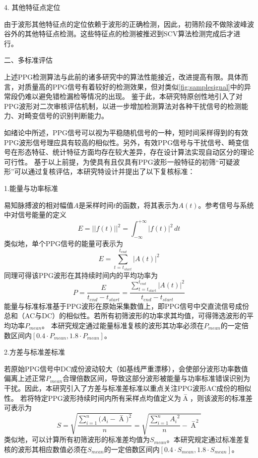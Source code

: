 4. 其他特征点定位

由于波形其他特征点的定位依赖于波形的正确检测，因此，初筛阶段不做除波峰波谷外的其他特征点检测。这些特征点的检测被推迟到SCV算法检测完成后才进行。

二、多标准评估

上述PPG检测算法与此前的诸多研究中的算法性能接近，改进提高有限。具体而言，对质量高的PPG信号有着较好的检测效果，但对类似\autoref{fig:samplesignal}中的异常段仍难以避免错检漏检等情况的出现。
鉴于此，本研究特原创性地引入了对PPG波形对二次审核评估机制，以进一步增加检测算法对各种干扰信号的检测能力、对畸变信号的识别判断能力。

如绪论中所述，PPG信号可以视为平稳随机信号的一种，短时间采样得到的有效PPG波形信号理应具有较高的相似性\cite{Qiu2012}。另外，有效PPG信号与干扰信号、畸变信号在形态特征、统计特征方面均存在较大差异，存在设计算法实现自动区分的理论可行性。
基于以上前提，为使具有且仅具有PPG波形一般特征的初筛“可疑波形”可以通过复核评估，本研究特设计并提出了以下复核标准：

1.能量与功率标准

易知脉搏波的相对幅值$A$是采样时间$t$的函数，将其表示为$A(t)$。参考信号与系统中对信号能量的定义\cite{Alan2019}
\begin{equation}
    \label{equ:energy}
    E=||f(t)||^2=\int_{-\infty}^{+\infty}{|f(t)|^2}\,d t
\end{equation}
类似地，单个PPG信号的能量可表示为
\begin{equation}
    \label{equ:ppge}
    E=\sum_{t=t_{start}}^{t_{end}}|A(t)|^2
\end{equation}
同理可得该PPG波形在其持续时间内的平均功率为
\begin{equation}
    \label{equ:ppgp}
    P=\frac{E}{t_{end}-t_{start}}=\frac{\sum_{t=t_{start}}^{t_{end}}|A(t)|^2}{t_{end}-t_{start}}
\end{equation}
能量与标准标准基于PPG波形在原始采集数值上，即PPG信号中交直流信号成份总和（AC与DC）的相似性。若所有初筛波形的功率求其均值，可得筛选波形的平均功率$P_{mean}$。
本研究规定通过能量标准复核的波形其功率必须在$P_{mean}$的一定倍数区间内$[0.4 \cdot P_{mean},1.8 \cdot P_{mean}]$。

2.方差与标准差标准

若原始PPG信号中DC成份波动较大（如基线严重漂移），会使部分波形功率数值偏离上述正常$P_{mean}$合理倍数区间，导致这部分波形被能量与功率标准错误识别为干扰。因此，本研究引入了方差与标准差标准以重点关注PPG波形AC成份的相似性。
若将特定PPG波形持续时间内所有采样点均值定义为$\mathop{A} \limits^-$，则该波形的标准差可表示为
\begin{equation}
    \label{equ:ppgstd}
    S=\sqrt{\frac{\sum_{i=1}^{n}{(A_i-\mathop{A} \limits^-})^2}{n}}=\sqrt{\frac{\sum_{i=1}^n{A_i}^2}{n}-{\mathop{A} \limits^-}^2}
\end{equation}
类似地，可以计算所有初筛波形的标准差均值为$S_{mean}$。本研究规定通过标准差复核的波形其相应数值必须在$S_{mean}$的一定倍数区间内$[0.4 \cdot S_{mean},1.8 \cdot S_{mean}]$。

